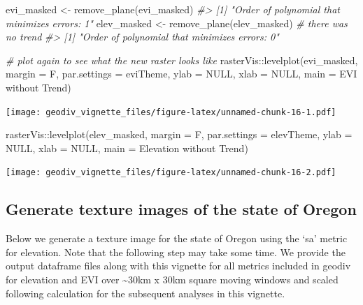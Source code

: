 \documentclass[
]{article}
\newenvironment{Shaded}{\begin{snugshade}}{\end{snugshade}}
\newcommand{\AttributeTok}[1]{\textcolor[rgb]{0.77,0.63,0.00}{#1}}
\newcommand{\CommentTok}[1]{\textcolor[rgb]{0.56,0.35,0.01}{\textit{#1}}}
\newcommand{\ConstantTok}[1]{\textcolor[rgb]{0.00,0.00,0.00}{#1}}
\newcommand{\FunctionTok}[1]{\textcolor[rgb]{0.00,0.00,0.00}{#1}}
\newcommand{\NormalTok}[1]{#1}
\newcommand{\OtherTok}[1]{\textcolor[rgb]{0.56,0.35,0.01}{#1}}
\newcommand{\SpecialCharTok}[1]{\textcolor[rgb]{0.00,0.00,0.00}{#1}}
\newcommand{\StringTok}[1]{\textcolor[rgb]{0.31,0.60,0.02}{#1}}
\begin{document}
\begin{Shaded}
\begin{Highlighting}[]
\NormalTok{evi\_masked }\OtherTok{\textless{}{-}} \FunctionTok{remove\_plane}\NormalTok{(evi\_masked)}
\CommentTok{\#\textgreater{} [1] "Order of polynomial that minimizes errors: 1"}
\NormalTok{elev\_masked }\OtherTok{\textless{}{-}} \FunctionTok{remove\_plane}\NormalTok{(elev\_masked) }\CommentTok{\# there was no trend}
\CommentTok{\#\textgreater{} [1] "Order of polynomial that minimizes errors: 0"}

\CommentTok{\# plot again to see what the new raster looks like}
\NormalTok{rasterVis}\SpecialCharTok{::}\FunctionTok{levelplot}\NormalTok{(evi\_masked, }\AttributeTok{margin =}\NormalTok{ F, }\AttributeTok{par.settings =}\NormalTok{ eviTheme, }
                     \AttributeTok{ylab =} \ConstantTok{NULL}\NormalTok{, }\AttributeTok{xlab =} \ConstantTok{NULL}\NormalTok{, }\AttributeTok{main =} \StringTok{\textquotesingle{}EVI without Trend\textquotesingle{}}\NormalTok{)}
\end{Highlighting}
\end{Shaded}

\texttt{[image: geodiv\_vignette\_files/figure-latex/unnamed-chunk-16-1.pdf]}

\begin{Shaded}
\begin{Highlighting}[]
\NormalTok{rasterVis}\SpecialCharTok{::}\FunctionTok{levelplot}\NormalTok{(elev\_masked, }\AttributeTok{margin =}\NormalTok{ F, }\AttributeTok{par.settings =}\NormalTok{ elevTheme, }
                     \AttributeTok{ylab =} \ConstantTok{NULL}\NormalTok{, }\AttributeTok{xlab =} \ConstantTok{NULL}\NormalTok{, }\AttributeTok{main =} \StringTok{\textquotesingle{}Elevation without Trend\textquotesingle{}}\NormalTok{)}
\end{Highlighting}
\end{Shaded}

\texttt{[image: geodiv\_vignette\_files/figure-latex/unnamed-chunk-16-2.pdf]}

\hypertarget{generate-texture-images-of-the-state-of-oregon}{%
\subsection{Generate texture images of the state of
Oregon}\label{generate-texture-images-of-the-state-of-oregon}}

Below we generate a texture image for the state of Oregon using the `sa'
metric for elevation. Note that the following step may take some time.
We provide the output dataframe files along with this vignette for all
metrics included in geodiv for elevation and EVI over
\textasciitilde30km x 30km square moving windows and scaled following
calculation for the subsequent analyses in this vignette.
\end{document}

